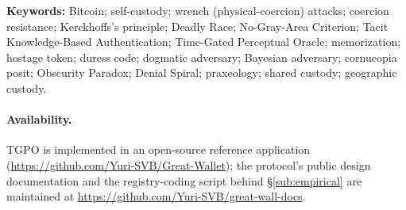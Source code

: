 \documentclass[a4paper,11pt]{article}
\theoremstyle{gw}
\theoremstyle{definition}
\theoremstyle{remark}
\begin{document}
\vspace{2pt}
\noindent\small\textbf{Keywords:} 
Bitcoin; self-custody; wrench (physical-coercion) attacks; coercion resistance;
Kerckhoffs's principle; Deadly Race; No-Gray-Area Criterion; 
Tacit Knowledge-Based Authentication; Time-Gated Perceptual Oracle; memorization;
hostage token; duress code; dogmatic adversary; Bayesian adversary;
cornucopia posit; Obscurity Paradox; Denial Spiral; praxeology;
shared custody; geographic custody.\normalsize

\vspace{4pt}












\paragraph*{Availability.}
TGPO is implemented in an open-source reference application
(\url{https://github.com/Yuri-SVB/Great-Wallet}); the protocol's public design
documentation and the registry-coding script behind \S\ref{sub:empirical} are
maintained at \url{https://github.com/Yuri-SVB/great-wall-docs}.

\appendix




\end{document}
